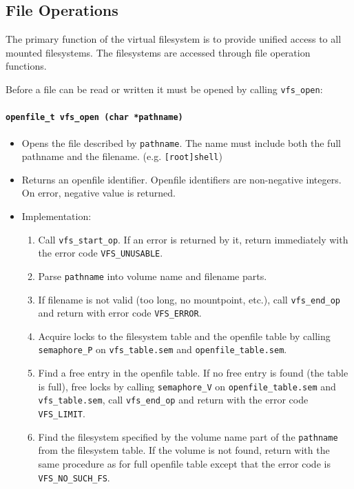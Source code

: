 \documentclass[twoside,a4paper]{report}
\makeatletter
\newenvironment{function}[3]{%
\paragraph{\texttt{#1 {\textbf{#2}} (#3)}}%
\index{#2@\texttt{#2}}%
\begin{itemize}%
}{%
\end{itemize}%
}
\makeatother
\begin{document}
\subsection{File Operations}
\label{sec:fileops}


The primary function of the virtual filesystem is to provide unified
access to all mounted filesystems. The filesystems are accessed
through file operation functions.

Before a file can be read or written it must be opened by calling
\texttt{vfs\_open}:

\begin{function}{openfile\_t}{vfs\_open}{char *pathname}

\item Opens the file described by \texttt{pathname}. The name must
include both the full pathname and the filename. (e.g.
\texttt{[root]shell})

\item Returns an openfile identifier. Openfile identifiers are
non-negative integers. On error, negative value is returned.

\item Implementation:
\begin{enumerate}

\item Call \texttt{vfs\_start\_op}. If an error is returned by it,
 return immediately with the error code \texttt{VFS\_UNUSABLE}.

\item Parse \texttt{pathname} into volume name and filename parts.

\item If filename is not valid (too long, no mountpoint, etc.), call
\texttt{vfs\_end\_op} and return with error code \texttt{VFS\_ERROR}.

\item Acquire locks to the filesystem table and the openfile table by
calling \texttt{semaphore\_P} on \texttt{vfs\_table.sem} and
\texttt{openfile\_table.sem}.

\item Find a free entry in the openfile table. If no free entry is found
(the table is full), free locks by calling \texttt{semaphore\_V} on
\texttt{openfile\_table.sem} and \texttt{vfs\_table.sem}, call
\texttt{vfs\_end\_op} and return with the error code \texttt{VFS\_LIMIT}.

\item Find the filesystem specified by the volume name part of the
\texttt{pathname} from the filesystem table. If the volume is not found,
return with the same procedure as for full openfile table except that
the error code is \texttt{VFS\_NO\_SUCH\_FS}.


\end{enumerate}
\end{function}
\end{document}
